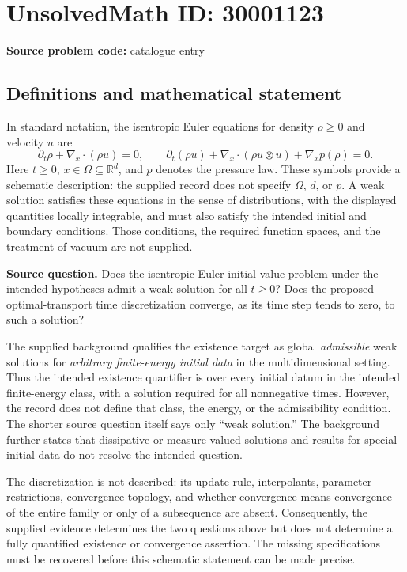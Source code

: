 \documentclass[11pt]{article}
\newcommand{\R}{\mathbb{R}}
\begin{document}
\section*{UnsolvedMath ID: 30001123}
\textbf{Source problem code:} catalogue entry
\subsection{Definitions and mathematical statement}
In standard notation, the isentropic Euler equations for density \(\rho\geq 0\) and velocity \(u\) are
\[
\partial_t\rho+\nabla_x\!\cdot(\rho u)=0,
\qquad
\partial_t(\rho u)+\nabla_x\!\cdot(\rho u\otimes u)+\nabla_x p(\rho)=0.
\]
Here \(t\geq0\), \(x\in\Omega\subseteq\R^d\), and \(p\) denotes the pressure law. These symbols provide a schematic description: the supplied record does not specify \(\Omega\), \(d\), or \(p\). A weak solution satisfies these equations in the sense of distributions, with the displayed quantities locally integrable, and must also satisfy the intended initial and boundary conditions. Those conditions, the required function spaces, and the treatment of vacuum are not supplied.

\textbf{Source question.} Does the isentropic Euler initial-value problem under the intended hypotheses admit a weak solution for all \(t\geq0\)? Does the proposed optimal-transport time discretization converge, as its time step tends to zero, to such a solution?

The supplied background qualifies the existence target as global \emph{admissible} weak solutions for \emph{arbitrary finite-energy initial data} in the multidimensional setting. Thus the intended existence quantifier is over every initial datum in the intended finite-energy class, with a solution required for all nonnegative times. However, the record does not define that class, the energy, or the admissibility condition. The shorter source question itself says only ``weak solution.'' The background further states that dissipative or measure-valued solutions and results for special initial data do not resolve the intended question.

The discretization is not described: its update rule, interpolants, parameter restrictions, convergence topology, and whether convergence means convergence of the entire family or only of a subsequence are absent. Consequently, the supplied evidence determines the two questions above but does not determine a fully quantified existence or convergence assertion. The missing specifications must be recovered before this schematic statement can be made precise.
\end{document}
